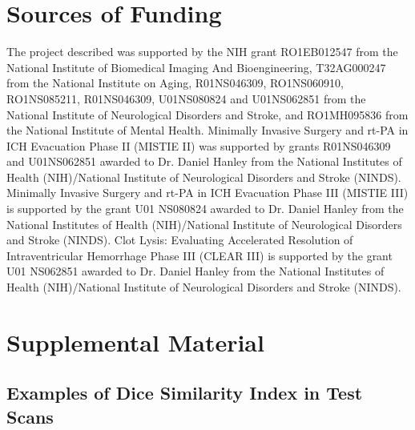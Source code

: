\documentclass{elsarticle_nonatbib}\usepackage[]{graphicx}\usepackage[]{color}
\begin{document}
\section*{Sources of Funding}
The project described was supported by the NIH grant RO1EB012547 from the National Institute of Biomedical Imaging And Bioengineering, T32AG000247 from the National Institute on Aging, R01NS046309, RO1NS060910, RO1NS085211, R01NS046309, U01NS080824 and U01NS062851 from the National Institute of Neurological Disorders and Stroke, and RO1MH095836 from the National Institute of Mental Health. Minimally Invasive Surgery and rt-PA in ICH Evacuation Phase II (MISTIE II) was supported by grants R01NS046309 and U01NS062851 awarded to Dr. Daniel Hanley from the National Institutes of Health (NIH)/National Institute of Neurological Disorders and Stroke (NINDS).  Minimally Invasive Surgery and rt-PA in ICH Evacuation Phase III (MISTIE III) is supported by the grant U01 NS080824 awarded to Dr. Daniel Hanley from the National Institutes of Health (NIH)/National Institute of Neurological Disorders and Stroke (NINDS). Clot Lysis: Evaluating Accelerated Resolution of Intraventricular Hemorrhage Phase III (CLEAR III) is supported by the grant U01 NS062851 awarded to Dr. Daniel Hanley from the National Institutes of Health (NIH)/National Institute of Neurological Disorders and Stroke (NINDS). 

\newpage
%
%
%
\printbibliography

\clearpage
\section{Supplemental Material}

\subsection{Examples of Dice Similarity Index in Test Scans}
\end{document}
